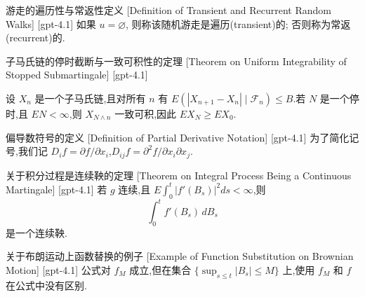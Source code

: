 \documentclass[UTF8]{ctexart}
\begin{document}
    \begin{dfn}
        {游走的遍历性与常返性定义}
        [Definition of Transient and Recurrent Random Walks]
        [gpt-4.1]
        如果 $
u = \varnothing$, 则称该随机游走是遍历(transient)的; 否则称为常返(recurrent)的.
    \end{dfn}
    
    
    
    \begin{thm}
        {子马氏链的停时截断与一致可积性的定理}
        [Theorem on Uniform Integrability of Stopped Submartingale]
        [gpt-4.1]
        
设 $X_{n}$ 是一个子马氏链,且对所有 $n$ 有 $E\left( | X_{n+1} - X_{n} | \mid {\mathcal{F}}_{n} \right) \leq B$.若 $N$ 是一个停时,且 $E N < \infty$,则 $X_{N \wedge n}$ 一致可积,因此 $E X_{N} \ge E X_{0}$.

    \end{thm}
    
    
    
    \begin{dfn}
        {偏导数符号的定义}
        [Definition of Partial Derivative Notation]
        [gpt-4.1]
        为了简化记号,我们记 $D_{i} f = \partial f / \partial x_{i}$,$D_{ij} f = \partial^{2} f / \partial x_{i} \partial x_{j}$.
    \end{dfn}
    
    
    
    \begin{thm}
        {关于积分过程是连续鞅的定理}
        [Theorem on Integral Process Being a Continuous Martingale]
        [gpt-4.1]
        若 $g$ 连续,且 $E \int_0^t |f'(B_s)|^2 ds < \infty$,则
\[
\int_0^t f'(B_s)\, dB_s
\]
是一个连续鞅.
    \end{thm}
    
    
    
    \begin{xmp}
        {关于布朗运动上函数替换的例子}
        [Example of Function Substitution on Brownian Motion]
        [gpt-4.1]
        公式对 $f_{M}$ 成立,但在集合 $\{\sup_{s \leq t} |B_{s}| \leq M\}$ 上,使用 $f_{M}$ 和 $f$ 在公式中没有区别.
    \end{xmp}
    
\end{document}
